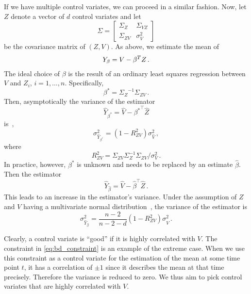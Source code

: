 If we have multiple control variates, we can proceed in a similar fashion.
Now, let ${Z}$ denote a vector of $d$ control variates and let
\[
\Sigma=
\begin{bmatrix}
\Sigma_{ Z} & \Sigma_{V Z}\\
\Sigma_{ Z V} & \sigma_V^2
\end{bmatrix}
\]
be the covariance matrix of $({Z},V)$.
As above, we estimate the mean of
\[
    {Y}_{\beta}=V -{\beta}^{T}{Z}\,.
    \]
The ideal choice of $\beta$ is the result of an ordinary least squares regression between $V$
and $Z_i$, $i=1,\dots,n$.
Specifically,
\[
	\beta^{*}={\Sigma_{ Z}}^{-1}{\Sigma}_{ Z V}\,.
\]
Then, asymptotically
the variance of the estimator
\begin{equation}
\hat{Y}_{{\beta^*}}=\hat{V}-{\beta^*}^{\top}\hat{ Z}
\end{equation}
is~\cite{szechtman2003control},
\begin{equation}\label{eq:lcv_asym}
    {\sigma_{\hat Y_{\beta^*}}^2} = (1 - R_{ Z V}^2){\sigma_{\hat V}^2}\,,
\end{equation}
where
\begin{equation*}
    R_{ Z V}^2=\Sigma_{ Z V}\Sigma_{ Z}^{-1}\Sigma_{ Z V} / \sigma_V^2\,.
\end{equation*}
In practice, however, $\beta^*$ is unknown and needs to be replaced by
an estimate $\hat{\beta}$.
Then the estimator
\begin{equation}
\hat{Y}_{\hat{\beta}}=\hat{V}-\hat{\beta}^{\top}\hat{ Z}\,.
\end{equation}
This leads to an increase in the estimator's variance.
Under the assumption of $Z$ and $V$ having a multivariate normal
distribution~\cite{cheng1978analysis,lavenberg1982statistical}, the variance of the estimator is
\begin{equation}\label{eq:lcv_norm_varred}
    {\sigma_{\hat{Y}_{\hat{\beta}}}^2} = \frac{n - 2}{n - 2 - d}(1 - R_{ ZV}^2){\sigma_{\hat V}^2}\,.
\end{equation}

Clearly, a control  variate is ``good'' if it is highly correlated with $V$.
The constraint in \eqref{eq:bd_constraint} is an example of the extreme case.
When we use this constraint as a control variate
for the estimation of the mean at some time point $t$, it has a correlation of $\pm1$
since it describes the mean at that time precisely.
Therefore the variance is reduced to zero.
We thus aim to pick control  variates that are highly correlated with $V$.

